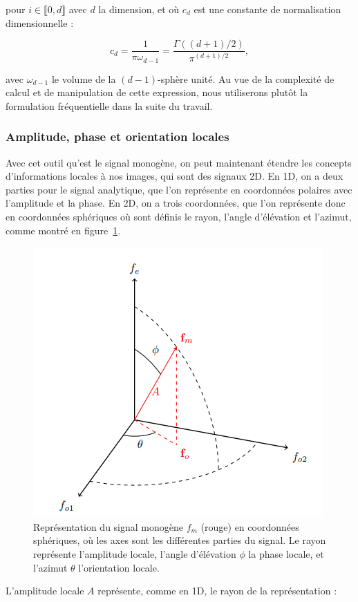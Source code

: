 pour $i\in\llbracket 0, d\rrbracket$ avec $d$ la dimension, et où $c_d$ est une constante de normalisation dimensionnelle :

\begin{equation}
    c_d = \frac1{\pi\omega_{d-1}} = \frac{\Gamma((d+1)/2)}{\pi^{(d+1)/2}},
\end{equation}

avec $\omega_{d-1}$ le volume de la $(d-1)$-sphère unité. Au vue de la complexité de calcul et de manipulation de cette expression, nous utiliserons plutôt la formulation fréquentielle dans la suite du travail.

\subsubsection{Amplitude, phase et orientation locales}

Avec cet outil qu'est le signal monogène, on peut maintenant étendre les concepts d'informations locales à nos images, qui sont des signaux 2D. En 1D, on a deux parties pour le signal analytique, que l'on représente en coordonnées polaires avec l'amplitude et la phase. En 2D, on a trois coordonnées, que l'on représente donc en coordonnées sphériques où sont définis le rayon, l'angle d'élévation et l'azimut, comme montré en figure~\ref{fig:spherical-representation}.

\begin{figure}
    \centering
    \includegraphics[width=.45\textwidth]{contenu/resources/images/spherical_representation}
    \caption[Représentation du signal monogène en coordonnées sphériques]{Représentation du signal monogène $f_m$ (rouge) en coordonnées sphériques, où les axes sont les différentes parties du signal. Le rayon représente l'amplitude locale, l'angle d'élévation $\phi$ la phase locale, et l'azimut $\theta$ l'orientation locale.}
    \label{fig:spherical-representation}
\end{figure}

L'amplitude locale $A$ représente, comme en 1D, le rayon de la représentation :

